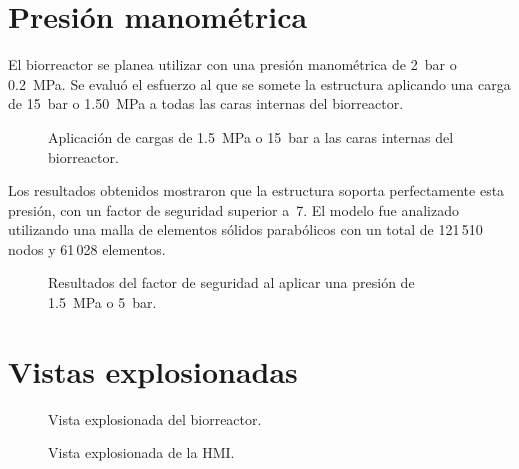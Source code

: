 \documentclass[11pt,tesis,twoside,openright,spanish]{upiiztt}
\begin{document}
\section*{Presión manométrica}

El biorreactor se planea utilizar con una presión manométrica de 2~bar o 0.2~MPa.
Se evaluó el esfuerzo al que se somete la estructura aplicando una carga de
15~bar o 1.50~MPa a todas las caras internas del biorreactor.

\begin{figure}[H]
  \centering
  \caption{Aplicación de cargas de 1.5~MPa o 15~bar a las caras internas del biorreactor.}
  \label{fig:cargas_manometricas}
\end{figure}

Los resultados obtenidos mostraron que la estructura soporta perfectamente esta
presión, con un factor de seguridad superior a~7. El modelo fue analizado
utilizando una malla de elementos sólidos parabólicos con un total de 121\,510
nodos y 61\,028 elementos.

\begin{figure}[H]
  \centering
  \caption{Resultados del factor de seguridad al aplicar una presión de 1.5~MPa o 5~bar.}
  \label{fig:fs_manometrica}
\end{figure}

\section*{Vistas explosionadas}

\begin{figure}[H]
  \centering
  \caption{Vista explosionada del biorreactor.}
  \label{fig:explosionada_biorreactor}
\end{figure}

\begin{figure}[H]
  \centering
  \caption{Vista explosionada de la HMI.}
  \label{fig:explosionada_hmi}
\end{figure}
\end{document}
